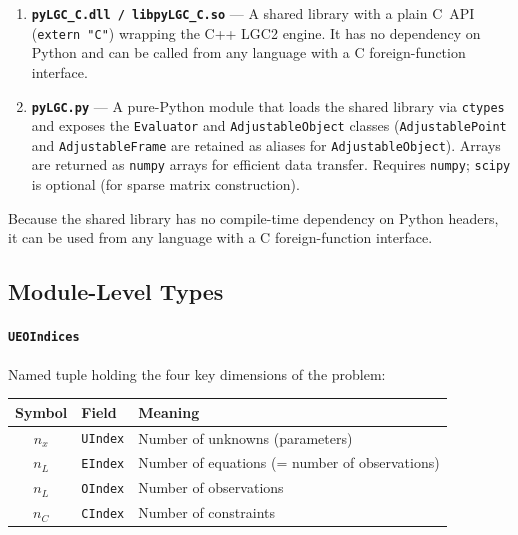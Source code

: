 \documentclass[a4paper,11pt]{article}
\newcommand{\code}[1]{\texttt{#1}}
\begin{document}
\begin{enumerate}
    \item \textbf{\code{pyLGC\_C.dll / libpyLGC\_C.so}} --- A shared
        library with a plain C~API (\code{extern "C"}) wrapping the C++
        LGC2 engine. It has no dependency on Python and can be called
        from any language with a C foreign-function interface.

    \item \textbf{\code{pyLGC.py}} --- A pure-Python module that loads
        the shared library via \code{ctypes} and exposes the
        \code{Evaluator} and \code{AdjustableObject} classes
        (\code{AdjustablePoint} and \code{AdjustableFrame} are retained
        as aliases for \code{AdjustableObject}). Arrays are returned as
        \code{numpy} arrays for efficient data transfer.
        Requires \code{numpy}; \code{scipy} is optional (for sparse
        matrix construction).
\end{enumerate}

Because the shared library has no compile-time dependency on Python
headers, it can be used from any language with a C foreign-function
interface.

\subsection{Module-Level Types}

\paragraph{\code{UEOIndices}} Named tuple holding the four key
dimensions of the problem:

\begin{center}
\begin{tabular}{cll}
    \toprule
    Symbol & Field & Meaning \\
    \midrule
    $n_x$ & \code{UIndex} & Number of unknowns (parameters) \\
    $n_L$ & \code{EIndex} & Number of equations (= number of observations) \\
    $n_L$ & \code{OIndex} & Number of observations \\
    $n_C$ & \code{CIndex} & Number of constraints \\
    \bottomrule
\end{tabular}
\end{center}
\end{document}
